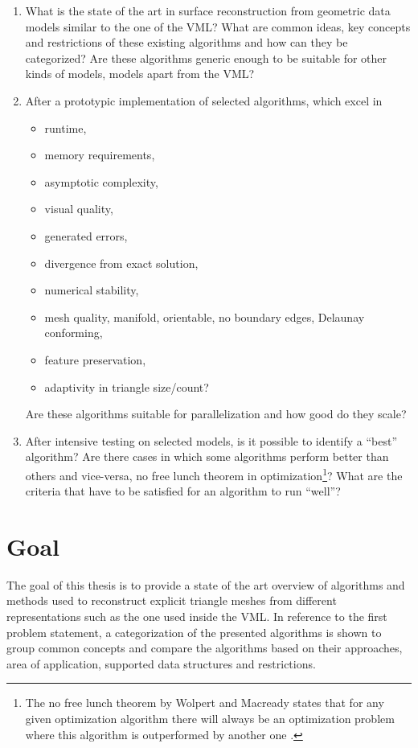 \begin{enumerate}
	\item What is the state of the art in surface reconstruction from geometric data models similar to the one of the VML?
	What are common ideas, key concepts and restrictions of these existing algorithms and how can they be categorized?
	Are these algorithms generic enough to be suitable for other kinds of models, \ie models apart from the VML?

	\item After a prototypic implementation of selected algorithms, which excel in
	\begin{itemize}
		\item runtime,
		\item memory requirements,
		\item asymptotic complexity,
		\item visual quality,
		\item generated errors,
		\item divergence from exact solution,
		\item numerical stability,
		\item mesh quality, \eg manifold, orientable, no boundary edges, Delaunay conforming,
		\item feature preservation,
		\item adaptivity in triangle size/count?
	\end{itemize}
	Are these algorithms suitable for parallelization and how good do they scale?

	\item After intensive testing on selected models, is it possible to identify a \enquote{best} algorithm?
	Are there cases in which some algorithms perform better than others and vice-versa, \cf no free lunch theorem in optimization\footnote{The no free lunch theorem by Wolpert and Macready states that for any given optimization algorithm there will always be an optimization problem where this algorithm is outperformed by another one \cite{no_free_lunch}.}?
	What are the criteria that have to be satisfied for an algorithm to run \enquote{well}?
\end{enumerate}


\section{Goal}
\label{sec:goal}

The goal of this thesis is to provide a state of the art overview of algorithms and methods used to reconstruct explicit triangle meshes from different representations such as the one used inside the VML.
In reference to the first problem statement, a categorization of the presented algorithms is shown to group common concepts and compare the algorithms based on their approaches, area of application, supported data structures and restrictions.

